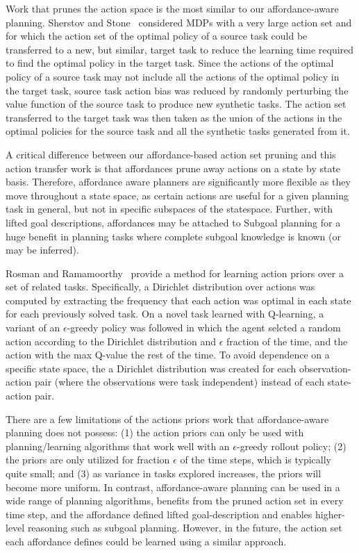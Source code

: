\documentclass[]{article}
\begin{document}
Work that prunes the action space is the most similar to our affordance-aware planning.
Sherstov and Stone~\cite{sherstov2005improving} considered MDPs with a very large action set and for which the action
set of the optimal policy of a source task could be transferred to a new, but similar, target
task to reduce the learning time required to find the optimal policy in the target task. Since the actions
of the optimal policy of a source task may not include all the actions of the optimal policy
in the target task, source task action bias was reduced by randomly perturbing the value function
of the source task to produce new synthetic tasks. The action set transferred to the target task
was then taken as the union of the actions in the optimal policies for the source task and all the
synthetic tasks generated from it.

A critical difference between our affordance-based action set pruning and this action transfer
work is that affordances prune away actions on a state by state basis. Therefore, affordance aware
planners are significantly more flexible as they move throughout a state space, as certain actions
are useful for a given planning task in general, but not in specific subspaces of the statespace. Further,
with lifted goal descriptions, affordances may be attached to Subgoal planning for a huge
benefit in planning tasks where complete subgoal knowledge is known (or may be inferred).

Rosman and Ramamoorthy~\cite{rosman2012good} provide a method for learning action priors over a set of related tasks. Specifically, a Dirichlet distribution over actions was computed by extracting the frequency that each action was optimal in each state for each previously solved task. On a novel task learned with Q-learning, a variant of an $\epsilon$-greedy policy was followed in which the agent selcted a random action according to the Dirichlet distribution and $\epsilon$ fraction of the time, and the action with the max Q-value the rest of the time. To avoid dependence on a specific state space, the a Dirichlet distribution was created for each observation-action pair (where the observations were task independent) instead of each state-action pair.

There are a few limitations of the actions priors work that affordance-aware planning does not possess: (1) the action priors can only be used with planning/learning algorithms that work well with an $\epsilon$-greedy rollout policy; (2) the priors are only utilized for fraction $\epsilon$ of the time steps, which is typically quite small; and (3) as variance in tasks explored increases, the priors will become more uniform. In contrast, affordance-aware planning can be used in a wide range of planning algorithms, benefits from the pruned action set in every time step, and the affordance defined lifted goal-description and enables higher-level reasoning such as subgoal planning. However, in the future, the action set each affordance defines could be learned using a similar approach.
\end{document}

